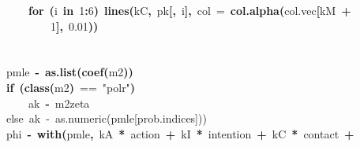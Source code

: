 \documentclass{article}
\makeatletter
\newcommand{\hlnumber}[1]{\textcolor[rgb]{0,0,0}{#1}}%
\newcommand{\hlfunctioncall}[1]{\textcolor[rgb]{.5,0,.33}{\textbf{#1}}}%
\newcommand{\hlstring}[1]{\textcolor[rgb]{.6,.6,1}{#1}}%
\newcommand{\hlkeyword}[1]{\textbf{#1}}%
\newcommand{\hlargument}[1]{\textcolor[rgb]{.69,.25,.02}{#1}}%
\newcommand{\hlcomment}[1]{\textcolor[rgb]{.18,.6,.34}{#1}}%
\newcommand{\hlassignement}[1]{\textbf{#1}}%
\newcommand{\hlsymbol}[1]{#1}%
\newcommand{\hlstd}[1]{\textcolor[rgb]{0,0,0}{#1}}%
\newenvironment{kframe}{%
 \def\FrameCommand##1{\hskip\@totalleftmargin \hskip-\fboxsep
 \colorbox{shadecolor}{##1}\hskip-\fboxsep
     \hskip-\linewidth \hskip-\@totalleftmargin \hskip\columnwidth}%
 \MakeFramed {\advance\hsize-\width
   \@totalleftmargin\z@ \linewidth\hsize
   \@setminipage}}%
 {\par\unskip\endMakeFramed}
\newenvironment{knitrout}{}{} %
\makeatother
\begin{document}
\begin{knitrout}
{\begin{kframe}
\begin{flushleft}
\hlstd{}{\ }{\ }{\ }{\ }{\ }{\ }{\ }{\ }{\ }{\ }{\ }{\ }\hlkeyword{for}{\ }\hlkeyword{(}\hlsymbol{i}{\ }\hlkeyword{in}{\ }\hlnumber{1}\hlkeyword{:}\hlnumber{6}\hlkeyword{)}{\ }\hlfunctioncall{lines}\hlkeyword{(}\hlsymbol{kC}\hlkeyword{,}{\ }\hlsymbol{pk}\hlkeyword{[}\hlkeyword{,}{\ }\hlsymbol{i}\hlkeyword{]}\hlkeyword{,}{\ }\hlargument{col}{\ }\hlargument{=}{\ }\hlfunctioncall{col.alpha}\hlkeyword{(}\hlsymbol{col.vec}\hlkeyword{[}\hlsymbol{kM}{\ }\hlkeyword{+}\hspace*{\fill}\\
\hlstd{}{\ }{\ }{\ }{\ }{\ }{\ }{\ }{\ }{\ }{\ }{\ }{\ }{\ }{\ }{\ }{\ }\hlnumber{1}\hlkeyword{]}\hlkeyword{,}{\ }\hlnumber{0.01}\hlkeyword{)}\hlkeyword{)}\hspace*{\fill}\\
\hlstd{}{\ }{\ }{\ }{\ }{\ }{\ }{\ }{\ }\hlkeyword{\usebox{\hlnormalsizeboxclosebrace}}\hspace*{\fill}\\
\hlstd{}\hspace*{\fill}\\
\hlstd{}{\ }{\ }{\ }{\ }{\ }{\ }{\ }{\ }\hlsymbol{pmle}{\ }\hlassignement{\usebox{\hlnormalsizeboxlessthan}-}{\ }\hlfunctioncall{as.list}\hlkeyword{(}\hlfunctioncall{coef}\hlkeyword{(}\hlsymbol{m2}\hlkeyword{)}\hlkeyword{)}\hspace*{\fill}\\
\hlstd{}{\ }{\ }{\ }{\ }{\ }{\ }{\ }{\ }\hlkeyword{if}{\ }\hlkeyword{(}\hlfunctioncall{class}\hlkeyword{(}\hlsymbol{m2}\hlkeyword{)}{\ }=={\ }\hlstring{"polr"}\hlkeyword{)}\hspace*{\fill}\\
\hlstd{}{\ }{\ }{\ }{\ }{\ }{\ }{\ }{\ }{\ }{\ }{\ }{\ }\hlsymbol{ak}{\ }\hlassignement{\usebox{\hlnormalsizeboxlessthan}-}{\ }\hlsymbol{m2}\hlkeyword{\usebox{\hlnormalsizeboxdollar}}\hlsymbol{zeta}\hspace*{\fill}\\
\hlstd{}{\ }{\ }{\ }{\ }{\ }{\ }{\ }{\ }\hlcomment{\usebox{\hlnormalsizeboxhash}else{\ }ak{\ }\usebox{\hlnormalsizeboxlessthan}-{\ }as.numeric(pmle[prob.indices]))}\hspace*{\fill}\\
\hlstd{}{\ }{\ }{\ }{\ }{\ }{\ }{\ }{\ }\hlsymbol{phi}\hlsymbol{}{\ }\hlassignement{\usebox{\hlnormalsizeboxlessthan}-}{\ }\hlfunctioncall{with}\hlkeyword{(}\hlsymbol{pmle}\hlkeyword{,}{\ }\hlsymbol{kA}{\ }\hlkeyword{*}{\ }\hlsymbol{action}{\ }\hlkeyword{+}{\ }\hlsymbol{kI}{\ }\hlkeyword{*}{\ }\hlsymbol{intention}{\ }\hlkeyword{+}{\ }\hlsymbol{kC}{\ }\hlkeyword{*}{\ }\hlsymbol{contact}{\ }\hlkeyword{+}\hspace*{\fill}\\

\end{flushleft}
\end{kframe}}
\end{knitrout}
\end{document}

